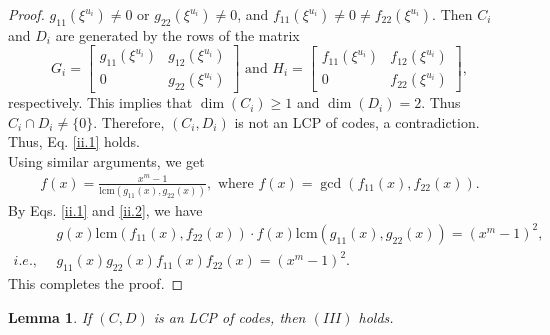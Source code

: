 \documentclass[12 pt]{extarticle}
\numberwithin{equation}{section}
\newtheorem{lemma}[theorem]{Lemma}
\theoremstyle{definition}
\begin{document}
\begin{proof}
 $g_{11}(\xi^{u_i})\neq 0$ or $g_{22}(\xi^{u_i})\neq 0$, and  $f_{11}(\xi^{u_i})\neq 0 \neq f_{22}(\xi^{u_i})$. Then $C_i$ and $D_i$ are generated by the rows of the matrix 
 $$
G_i=\begin{bmatrix}
g_{11}(\xi^{u_i}) & g_{12}(\xi^{u_i}) \\
0 & g_{22}(\xi^{u_i}) 
\end{bmatrix} \text{ and } H_i=\begin{bmatrix}
f_{11}(\xi^{u_i}) & f_{12}(\xi^{u_i}) \\
0 & f_{22}(\xi^{u_i}) 
\end{bmatrix},$$ respectively. This implies that $\dim(C_i)\geq 1$ and $\dim(D_i)=2$. Thus $C_i\cap D_i\neq \{0\}$. Therefore, $(C_i, D_i)$ is not an LCP of codes, a contradiction. Thus, Eq. \ref{ii.1} holds.\\
Using similar arguments, we get 
\begin{align}\label{ii.2}
    f(x)= \frac{x^m-1}{\text{lcm}(g_{11}(x),g_{22}(x))}, \text{ where } f(x)=\gcd(f_{11}(x),f_{22}(x)).
\end{align}
By Eqs. \ref{ii.1} and \ref{ii.2}, we have 
\begin{align*}
    &g(x)\text{lcm}(f_{11}(x),f_{22}(x))\cdot f(x)\text{lcm}(g_{11}(x),g_{22}(x))=(x^m-1)^2,\\
    i.e.,\ \  &g_{11}(x)g_{22}(x)f_{11}(x)f_{22}(x)=(x^m-1)^2.
    \end{align*}  
    This completes the proof.
\end{proof}





\begin{lemma}\label{nIII}
    If $(C,D)$ is an LCP of codes, then $(III)$ holds.
\end{lemma}
\end{document}
